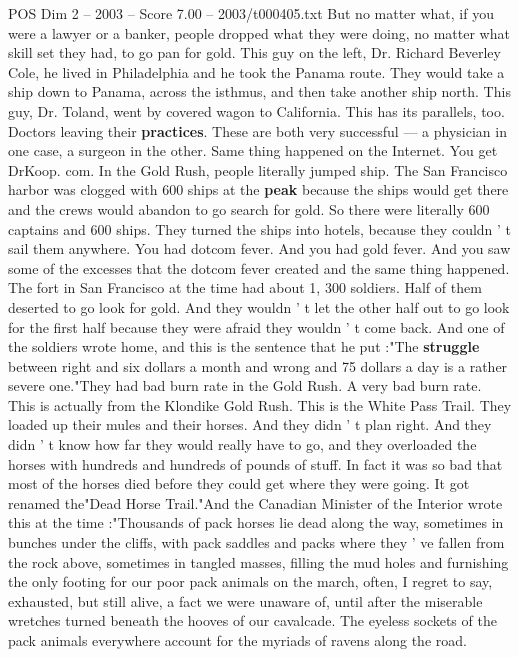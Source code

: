 \begin{textsample}{POS Dim 2 – 2003 – Score 7.00 – 2003/t000405.txt}
But no matter what, if you were a lawyer or a banker, people dropped what they were doing, no matter what skill set they had, to go pan for gold.
This guy on the left, Dr.
Richard Beverley Cole, he lived in Philadelphia and he took the Panama route.
They would take a ship down to Panama, across the isthmus, and then take another ship north.
This guy, Dr.
Toland, went by covered wagon to California.
This has its parallels, too.
Doctors leaving their \textbf{practices}.
These are both very successful — a physician in one case, a surgeon in the other.
Same thing happened on the Internet.
You get DrKoop. com.
In the Gold Rush, people literally jumped ship.
The San Francisco harbor was clogged with 600 ships at the \textbf{peak} because the ships would get there and the crews would abandon to go search for gold.
So there were literally 600 captains and 600 ships.
They turned the ships into hotels, because they couldn ' t sail them anywhere.
You had dotcom fever.
And you had gold fever.
And you saw some of the excesses that the dotcom fever created and the same thing happened.
The fort in San Francisco at the time had about 1, 300 soldiers.
Half of them deserted to go look for gold.
And they wouldn ' t let the other half out to go look for the first half because they were afraid they wouldn ' t come back.
And one of the soldiers wrote home, and this is the sentence that he put :"The \textbf{struggle} between right and six dollars a month and wrong and 75 dollars a day is a rather severe one."They had bad burn rate in the Gold Rush.
A very bad burn rate.
This is actually from the Klondike Gold Rush.
This is the White Pass Trail.
They loaded up their mules and their horses.
And they didn ' t plan right.
And they didn ' t know how far they would really have to go, and they overloaded the horses with hundreds and hundreds of pounds of stuff.
In fact it was so bad that most of the horses died before they could get where they were going.
It got renamed the"Dead Horse Trail."And the Canadian Minister of the Interior wrote this at the time :"Thousands of pack horses lie dead along the way, sometimes in bunches under the cliffs, with pack saddles and packs where they ' ve fallen from the rock above, sometimes in tangled masses, filling the mud holes and furnishing the only footing for our poor pack animals on the march, often, I regret to say, exhausted, but still alive, a fact we were unaware of, until after the miserable wretches turned beneath the hooves of our cavalcade.
The eyeless sockets of the pack animals everywhere account for the myriads of ravens along the road.

\end{textsample}
